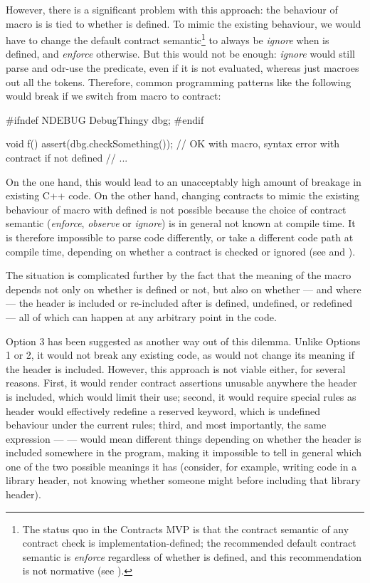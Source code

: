 However, there is a significant problem with this approach: the behaviour of macro  is is tied to whether   is defined. To mimic the existing behaviour, we would have to change the default contract semantic\footnote{The status quo in the Contracts MVP is that the contract semantic of any contract check is implementation-defined; the recommended default contract semantic is \emph{enforce} regardless of whether  is defined, and this recommendation is not normative (see \cite{P2877R0}).} to always be \emph{ignore} when  is defined, and \emph{enforce} otherwise. But this would not be enough: \emph{ignore} would still parse and odr-use the predicate, even if it is not evaluated, whereas  just macroes out all the tokens. Therefore, common programming patterns like the following would break if we switch  from macro to contract:

\begin{codeblock}
#ifndef NDEBUG
  DebugThingy dbg;
#endif

void f() {
  assert(dbg.checkSomething());  // OK with macro, syntax error with contract if  not defined
  // ...
}
\end{codeblock}

On the one hand, this would lead to an unacceptably high amount of breakage in existing C++ code. On the other hand, changing contracts to mimic the existing behaviour of macro  with  defined is not possible because the choice of contract semantic (\emph{enforce}, \emph{observe} or \emph{ignore}) is in general not known at compile time. It is therefore impossible to parse code differently, or take a different code path at compile time, depending on whether a contract is checked or ignored (see \cite{P2877R0} and \cite{P2834R1}).

The situation is complicated further by the fact that the meaning of the  macro depends not only on whether  is defined or not, but also on whether --- and where --- the  header is included or re-included after  is defined, undefined, or redefined --- all of which can happen at any arbitrary point in the code.

Option 3 has been suggested as another way out of this dilemma. Unlike Options 1 or 2, it would not break any existing code, as  would not change its meaning if the  header is included. However, this approach is not viable either, for several reasons. First, it would render contract assertions unusable anywhere the  header is included, which would limit their use; second, it would require special rules as header  would effectively redefine a reserved keyword, which is undefined behaviour under the current rules; third, and most importantly, the same expression ---  --- would mean different things depending on whether the  header is included somewhere in the program, making it impossible to tell in general which one of the two possible meanings it has (consider, for example, writing code in a library header, not knowing whether someone might  before including that library header).

